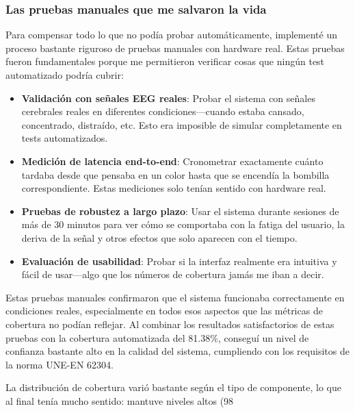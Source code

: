 \subsubsection{Las pruebas manuales que me salvaron la vida}

Para compensar todo lo que no podía probar automáticamente, implementé un proceso bastante riguroso de pruebas manuales con hardware real. Estas pruebas fueron fundamentales porque me permitieron verificar cosas que ningún test automatizado podría cubrir:

\begin{itemize}
    \item \textbf{Validación con señales EEG reales}: Probar el sistema con señales cerebrales reales en diferentes condiciones—cuando estaba cansado, concentrado, distraído, etc. Esto era imposible de simular completamente en tests automatizados.
    
    \item \textbf{Medición de latencia end-to-end}: Cronometrar exactamente cuánto tardaba desde que pensaba en un color hasta que se encendía la bombilla correspondiente. Estas mediciones solo tenían sentido con hardware real.
    
    \item \textbf{Pruebas de robustez a largo plazo}: Usar el sistema durante sesiones de más de 30 minutos para ver cómo se comportaba con la fatiga del usuario, la deriva de la señal y otros efectos que solo aparecen con el tiempo.
    
    \item \textbf{Evaluación de usabilidad}: Probar si la interfaz realmente era intuitiva y fácil de usar—algo que los números de cobertura jamás me iban a decir.
\end{itemize}

Estas pruebas manuales confirmaron que el sistema funcionaba correctamente en condiciones reales, especialmente en todos esos aspectos que las métricas de cobertura no podían reflejar. Al combinar los resultados satisfactorios de estas pruebas con la cobertura automatizada del 81.38\%, conseguí un nivel de confianza bastante alto en la calidad del sistema, cumpliendo con los requisitos de la norma UNE-EN 62304.

La distribución de cobertura varió bastante según el tipo de componente, lo que al final tenía mucho sentido: mantuve niveles altos (98%

